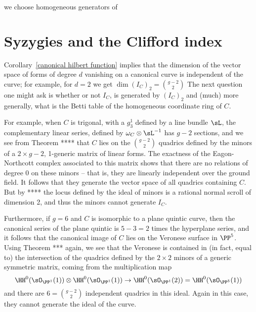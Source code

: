 we choose homogeneous generators of 


\section{Syzygies and the Clifford index}


Corollary~\ref{canonical hilbert function} implies that the dimension of the vector space of forms of degree $d$
vanishing on a canonical curve is independent of the curve; for example, for $d=2$ we get
$
\dim ({I_{C}})_{2} = {g-2\choose 2}
$
The next question one might ask is whether or not $I_{C}$, is generated by $(I_{C})_{2}$ and (much) more generally, what is the 
Betti table of the homogeneous coordinate ring of $C$.

 For example,
when $C$ is trigonal, with a $g^{1}_{3}$ defined by a line bundle $\sL$, the complementary linear series,
defined by $\omega_{C}\otimes \sL^{-1}$ has $g-2$ sections, and we see from Theorem ****
that $C$ lies on the ${g-2\choose 2}$ quadrics defined by the minors of a $2\times g-2$, 1-generic matrix of linear forms. The exactness of the Eagon-Northcott complex associated to this matrix shows that there are no relations of degree 0 on these minors -- that is, they are linearly independent over the ground field. It follows that they generate the vector space of all quadrics containing $C$. But by **** the locus defined by
the ideal of minors is a rational normal scroll of dimension 2, and thus the minors cannot generate $I_{C}$.

Furthermore, if $g = 6$ and $C$ is isomorphic to a plane quintic curve, then the canonical series of the plane quintic is $5-3 = 2$ times the hyperplane series, and it follows that the canonical image of $C$ lies on the Veronese surface in $\PP^{5}$. Using Theorem *** again, we see that the Veronese is contained in (in fact, equal to) the intersection of the quadrics defined by the $2\times 2$ minors of a generic symmetric matrix, coming from the 
multiplication map 
$$
\HH^{0}(\sO_{\PP^{1}}(1))\otimes \HH^{0}(\sO_{\PP^{1}}(1)) \to \HH^{0}(\sO_{\PP^{1}}(2)) = \HH^{0}(\sO_{\PP^{5}}(1))
$$
and there are $6 = {g-2\choose 2}$ independent quadrics in this ideal. Again in this case, they cannot generate the ideal of the curve.

